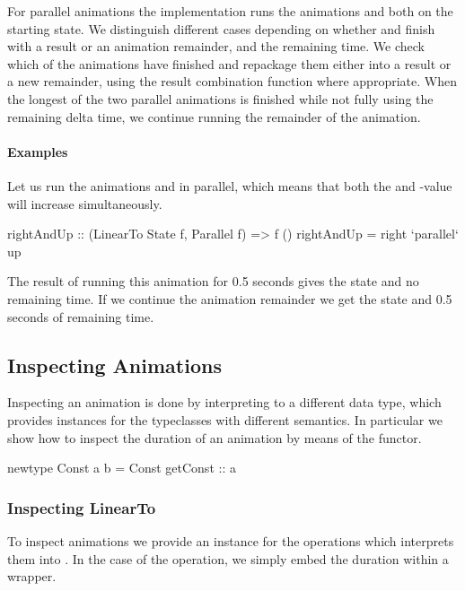 For parallel animations the  implementation runs
the animations  and  both on the starting
state. We distinguish different cases depending on whether  and
 finish with a result or an animation remainder, and the remaining
time. We check which of the animations have finished and repackage them
either into a result or a new remainder, using the result combination function
where appropriate. When the longest of the two parallel animations is finished
while not fully using the remaining delta time, we continue running the remainder
of the animation.

\paragraph{Examples}

Let us run the animations  and  in parallel, which means
that both the  and -value will increase simultaneously.

\begin{code}
rightAndUp :: (LinearTo State f, Parallel f) => f ()
rightAndUp = right `parallel` up
\end{code}

The result of running this animation for 0.5 seconds gives the state  and no remaining time. If we continue the animation
remainder we get the state  and 0.5 seconds of remaining 
time.

\subsection{Inspecting Animations}

Inspecting an animation is done by interpreting \dsl{} to a different data
type, which provides instances for the typeclasses with different semantics.
In particular we show how to inspect the duration of an animation
by means of the  functor.

\begin{spec}
newtype Const a b = Const { getConst :: a }
\end{spec}

\subsubsection{Inspecting LinearTo}

To inspect animations we provide an instance for the operations which
interprets them into . In the case of the 
operation, we simply embed the duration within a  wrapper.

